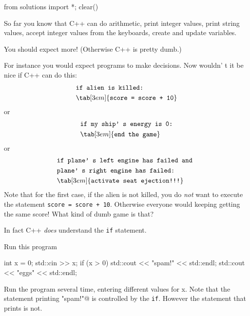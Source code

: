 \begin{python0}
from solutions import *; clear()
\end{python0}

So far you know that C++ can do arithmetic, print integer values, print
string values, accept integer values from the keyboards, create and
update variables.

You should expect more! (Otherwise C++ is pretty dumb.)

For instance you would expect programs to make decisions. Now
wouldn' t it be nice if C++ can do this:
\begin{align*}
&\texttt{if alien is killed:}\\
& \tab[3em]{\texttt{score = score + 10}}\\
\end{align*}
or
\begin{align*}
&\texttt{if my ship' s energy is 0:}\\
& \tab[3em]{\texttt{end the game}}\\
\end{align*}
or
\begin{align*}
&\texttt{if plane' s left engine has failed and }\\
&\texttt{plane' s right engine has failed:}\\
& \tab[3em]{\texttt{activate seat ejection!!!}}\\
\end{align*}
Note that for the first case, if the alien is not killed, you do
\textit{not} want to execute the statement \verb!score = score + 10!.
Otherwise everyone would keeping getting the same score! What kind of
dumb game is that?

In fact C++ \textit{does} understand the \verb!if! statement.

Run this program\\
\begin{console}
int x = 0;
std::cin >> x;
if (x > 0)
       std::cout << "spam!" << std::endl;
std::cout << "eggs" << std::endl;
\end{console}

Run the program several time, entering different values for x. Note that
the statement printing \verb@"spam!"@ is controlled by the \verb!if!.
However the statement that prints  is not.

